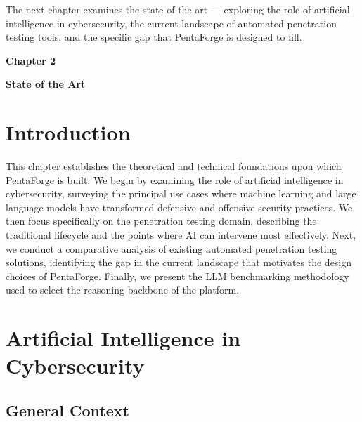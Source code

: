 \documentclass[12pt,a4paper]{report}
\begin{document}
The next chapter examines the state of the art --- exploring the role of artificial
intelligence in cybersecurity, the current landscape of automated penetration testing
tools, and the specific gap that PentaForge is designed to fill.
\pagestyle{fancy}
\newpage
\pagestyle{chaptertwo}

\vspace*{4cm}

{\fontsize{26}{30}\selectfont \textbf{Chapter 2}}\par

\vspace{1cm}

{\LARGE\bfseries State of the Art}

\vspace{0.8cm}

\setcounter{chapter}{2}
\setcounter{section}{0}

\section{Introduction}

This chapter establishes the theoretical and technical foundations upon which
PentaForge is built. We begin by examining the role of artificial intelligence
in cybersecurity, surveying the principal use cases where machine learning and
large language models have transformed defensive and offensive security practices.
We then focus specifically on the penetration testing domain, describing the
traditional lifecycle and the points where AI can intervene most effectively.
Next, we conduct a comparative analysis of existing automated penetration
testing solutions, identifying the gap in the current landscape that motivates
the design choices of PentaForge. Finally, we present the LLM benchmarking
methodology used to select the reasoning backbone of the platform.

\section{Artificial Intelligence in Cybersecurity}

\subsection{General Context}
\end{document}
